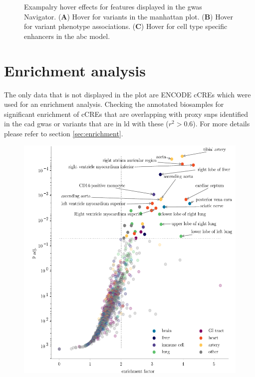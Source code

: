 {\begin{figure}[h!]
        \begin{minipage}{\captionwidth}
            \caption[database]{\newline
            Exampalry hover effects for features displayed in the \ac{gwas} Navigator. (\textbf{A}) Hover for variants in the manhattan plot. (\textbf{B}) Hover for variant phenotype associations. (\textbf{C}) Hover for cell type specific enhancers in the \ac{abc} model.}
            \label{fig:GWAS_navigator_hover}
        \end{minipage}
    \end{figure}

\section{Enrichment analysis}
\label{sec:result_enrichment}
The only data that is not displayed in the plot are ENCODE \acp{cCRE} which were used for an enrichment analysis. Checking the annotated biosamples for significant enrichment of \acp{cCRE} that are overlapping with proxy \acp{snp} identified in the \ac{cad} \ac{gwas} or variants that are in \ac{ld} with these ($r^2 > 0.6$). For more details please refer to section \ref{sec:enrichment}.

\begin{figure}[h!]
\capstart
    \centering
	\includegraphics{Abbildung/enrichment_scatter.pdf}


\end{figure}}
